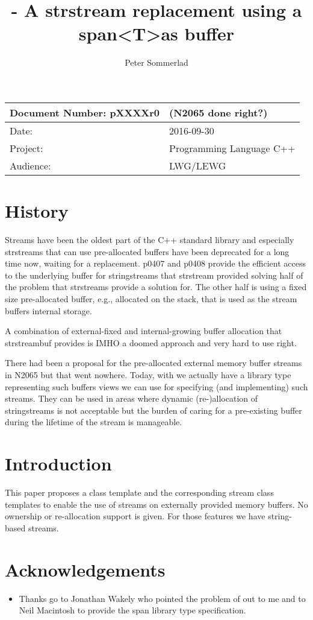 \documentclass[ebook,11pt,article]{memoir}
\title{\papernumber{} - A strstream replacement using a span\textless{}T\textgreater as buffer}
\author{Peter Sommerlad}
\date{\paperdate}                %
\newcommand{\papernumber}{pXXXXr0}
\newcommand{\paperdate}{2016-09-30}
\begin{document}
\maketitle
\begin{tabular}[t]{|l|l|}\hline 
Document Number: \papernumber & (N2065 done right?)\\\hline
Date: & \paperdate \\\hline
Project: & Programming Language C++\\\hline 
Audience: & LWG/LEWG\\\hline
\end{tabular}

\chapter{History}
Streams have been the oldest part of the C++ standard library and especially strstreams that can use pre-allocated buffers have been deprecated for a long time now, waiting for a replacement. p0407 and p0408 provide the efficient access to the underlying buffer for stringstreams that strstream provided solving half of the problem that strstreams provide a solution for. The other half is using a fixed size pre-allocated buffer, e.g., allocated on the stack, that is used as the stream buffers internal storage.

A combination of external-fixed and internal-growing buffer allocation that strstreambuf provides is IMHO a doomed approach and very hard to use right.

There had been a proposal for the pre-allocated external memory buffer streams in N2065 but that went nowhere. Today, with  we actually have a library type representing such buffers views we can use for specifying (and implementing) such streams. They can be used in areas where dynamic (re-)allocation of stringstreams is not acceptable but the burden of caring for a pre-existing buffer during the lifetime of the stream is manageable. 

\chapter{Introduction}
This paper proposes a class template  and the corresponding stream class templates to enable the use of streams on externally provided memory buffers. No ownership or re-allocation support is given. For those features we have string-based streams.

\chapter{Acknowledgements}
\begin{itemize}
\item Thanks go to Jonathan Wakely who pointed the problem of  out to me and to Neil Macintosh to provide the span library type specification.
\end{itemize}
\end{document}
